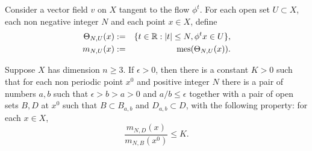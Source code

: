 Consider  a vector field $v$ on $X$ tangent to the flow $\phi^t$.
For each open set $U\subset X$, each non
negative integer $N$ and each
point $x\in X$, define
\begin{eqnarray}\label{defm}
\Theta_{N,U}(x)&:=&\{t\in{\Bbb{R}}: |t|\leq N, \phi^tx\in U\},\\
   m_{N,U}(x)&:=&\hbox{\rm mes} {(\Theta_{N,U}(x))}.\nonumber
\end{eqnarray}
\begin{lem}
Suppose $X$ has dimension $n\ge 3$.
If $\epsilon>0$, then
there is a constant $K>0$ such that for each non periodic point
$x^0$ and positive integer $N$ there is a pair of  numbers
$a,b$  such that $\epsilon>b>a>0$ and $a/b \leq\epsilon$ together with
a pair of open sets $B,D$ at $x^0$ such that
$B\subset B_{a,b}$ and $D_{a,b}\subset D$, with the following property:
for each  $x\in X$,
\begin{equation}\label{bddn}
\dfrac{m_{N,D}(x)}{m_{N,B}(x^0)} \leq K.
\end{equation}
\end{lem}
